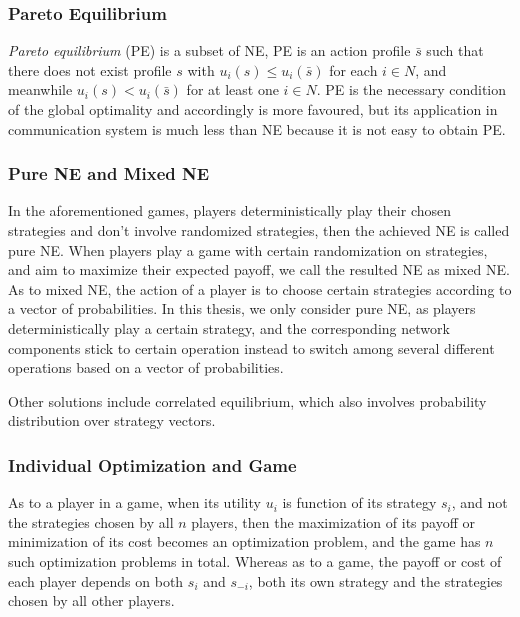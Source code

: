 


\subsubsection*{Pareto Equilibrium}
\textit{Pareto equilibrium} (PE) is a subset of NE, PE is an action profile $\bar{s}$ such that there does not exist profile $s$ with $u_i(s)\leq u_i(\bar{s})$ for each $i\in N$, and meanwhile $u_i(s)< u_i(\bar{s})$ for at least one $i\in N$.
PE is the necessary condition of the global optimality and accordingly is more favoured, but its application in communication system is much less than NE because it is not easy to obtain PE.


\subsubsection*{Pure NE and Mixed NE}
In the aforementioned games, players deterministically play their chosen strategies and don't involve randomized strategies, then the achieved NE is called pure NE. 
When players play a game with certain randomization on strategies, and aim to maximize their expected payoff, we call the resulted NE as mixed NE.
As to mixed NE, the action of a player is to choose certain strategies according to a vector of probabilities.
In this thesis, we only consider pure NE, as players deterministically play a certain strategy, and the corresponding network components stick to certain operation instead to switch among several different operations based on a vector of probabilities.

Other solutions include correlated equilibrium, which also involves probability distribution over strategy vectors.





\subsubsection*{Individual Optimization and Game}
As to a player in a game, when its utility $u_i$ is function of its strategy $s_i$, and not the strategies chosen by all $n$ players, then the maximization of its payoff or minimization of its cost becomes an optimization problem, and the game has $n$ such optimization problems in total.
Whereas as to a game, the payoff or cost of each player depends on both $s_i$ and $s_{-i}$, both its own strategy and the strategies chosen by all other players.






